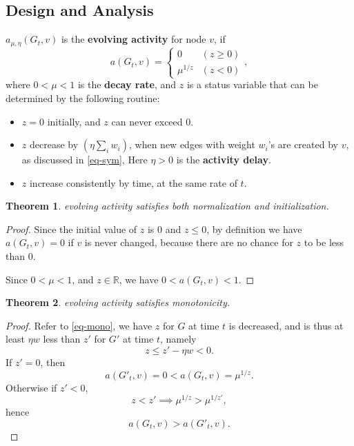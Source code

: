 \documentclass[12pt,abstract=true]{scrartcl}
\numberwithin{equation}{section}
\theoremstyle{definition}   \newtheorem{definition}{Definition}[section]
\theoremstyle{plain}        \newtheorem{theorem}{Theorem}[section]
\theoremstyle{plain}        \newtheorem{observation}{Observation}[section]
\theoremstyle{plain}        \newtheorem{fact}{Fact}[section]
\theoremstyle{plain}        \newtheorem{claim}{Claim}[section]
\theoremstyle{plain}        \newtheorem{lemma}[theorem]{Lemma}
\theoremstyle{plain}        \newtheorem{corollary}[theorem]{Corollary}
\theoremstyle{remark}       \newtheorem{example}{Example}[section]
\theoremstyle{remark}       \newtheorem{remark}{Remark}[section]
\begin{document}
\subsection{Design and Analysis}

 $a_{\mu,\eta}(G_t,v)$ is the \textbf{evolving activity} for node $v$, if
\begin{equation}
a(G_t,v)=\begin{cases}
0& (z\geq 0)\\
\mu^{1/z} & (z<0)
\end{cases},
\end{equation}
where $0<\mu<1$ is the \textbf{decay rate}, and $z$ is a status variable that can
be determined by the following routine:
\begin{itemize}
\item $z=0$ initially, and $z$ can never exceed $0$.
\item $z$ decrease by $\left(\eta\sum_i w_i\right)$, when new edges with weight
$w_i$'s are created by $v$, as discussed in \eqref{eq-sym}, Here $\eta>0$ is the
\textbf{activity delay}.
\item $z$ increase consistently by time, at the same rate of $t$.
\end{itemize}

\begin{theorem}
evolving activity satisfies both normalization and initialization.
\end{theorem}
\begin{proof}
Since the initial value of $z$ is $0$ and $z\leq 0$, by definition we have
$a(G_t,v)=0$ if $v$ is never changed, because there are no chance for $z$
to be less than $0$.

Since $0<\mu<1$, and $z\in\mathbb{R}$, we have $0<a(G_t,v)<1$.
\end{proof}

\begin{theorem}
evolving activity satisfies monotonicity.
\end{theorem}
\begin{proof}
Refer to \eqref{eq-mono}, we have $z$ for $G$ at time $t$ is decreased, and
is thus at least $\eta w$ less than $z'$ for $G'$ at time $t$, namely
\begin{equation}z\leq z'-\eta w<0.\end{equation}
If $z'=0$, then
\begin{equation}
a(G'_t,v)=0<a(G_t,v)=\mu^{1/z}.
\end{equation}
Otherwise if $z'<0$,
\begin{equation}
z<z'\implies \mu^{1/z}>\mu^{1/z'},
\end{equation}
hence
\begin{equation}
a(G_t,v)>a(G'_t,v).
\end{equation}
\end{proof}
\end{document}
